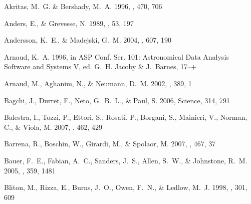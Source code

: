 \documentclass[12pt,preprint]{aastex}
\begin{document}
\begin{thebibliography}{} %

{Akritas}, M.~G. \& {Bershady}, M.~A. 1996, \apj, 470, 706

{Anders}, E., \& {Grevesse}, N. 1989, \gca, 53, 197

{Andersson}, K.~E., \& {Madejski}, G.~M. 2004, \apj, 607, 190

{Arnaud}, K.~A. 1996, in ASP Conf. Ser. 101: Astronomical Data Analysis
  Software and Systems V, ed. G.~H. {Jacoby} \& J.~{Barnes}, 17--+

{Arnaud}, M., {Aghanim}, N., \& {Neumann}, D.~M. 2002, \aap, 389, 1

{Bagchi}, J., {Durret}, F., {Neto}, G.~B.~L., \& {Paul}, S. 2006, Science, 314,
  791

{Balestra}, I., {Tozzi}, P., {Ettori}, S., {Rosati}, P., {Borgani}, S.,
  {Mainieri}, V., {Norman}, C., \& {Viola}, M. 2007, \aap, 462, 429

{Barrena}, R., {Boschin}, W., {Girardi}, M., \& {Spolaor}, M. 2007, \aap, 467,
  37

{Bauer}, F.~E., {Fabian}, A.~C., {Sanders}, J.~S., {Allen}, S.~W., \&
  {Johnstone}, R.~M. 2005, \mnras, 359, 1481

{Bliton}, M., {Rizza}, E., {Burns}, J.~O., {Owen}, F.~N., \& {Ledlow}, M.~J.
  1998, \mnras, 301, 609


\end{thebibliography}
\end{document}
